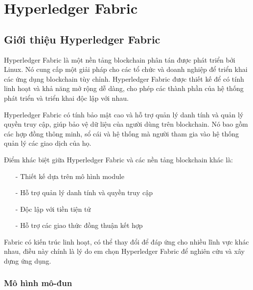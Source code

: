 \chapter{ Hyperledger Fabric}
\label{chap:hyper}
\section{Giới thiệu Hyperledger Fabric }
Hyperledger Fabric là một nền tảng blockchain phân tán được phát triển bởi Linux. Nó 
cung cấp một giải pháp cho các tổ chức và doanh nghiệp để triển khai các ứng dụng blockchain 
tùy chỉnh. Hyperledger Fabric được thiết kế để có tính linh hoạt và khả năng mở rộng dễ dàng, 
cho phép các thành phần của hệ thống phát triển và triển khai độc lập với nhau.

Hyperledger Fabric có tính bảo mật cao và hỗ trợ quản lý danh tính và quản lý quyền truy cập, 
giúp bảo vệ dữ liệu của người dùng trên blockchain. Nó bao gồm các hợp đồng thông minh, sổ cái và
hệ thống mà người tham gia vào hệ thống quản lý các giao dịch của họ.


Điểm khác biệt giữa Hyperledger Fabric và các nền tảng blockchain khác là:
\begin{itemize}
    \item[-] Thiết kế dựa trên mô hình module 
    \item[-] Hỗ trợ quản lý danh tính và quyền truy cập
    \item[-] Độc lập với tiền tiện tử
    \item[-] Hỗ trợ các giao thức đồng thuận kết hợp
\end{itemize}

Fabric có kiến trúc linh hoạt, có thể thay đổi để đáp ứng cho nhiều lĩnh vực khác nhau, 
điều này chính là lý do em chọn Hyperledger Fabric để nghiên cứu và xây dựng ứng dụng.
\subsection{Mô hình mô-đun}

